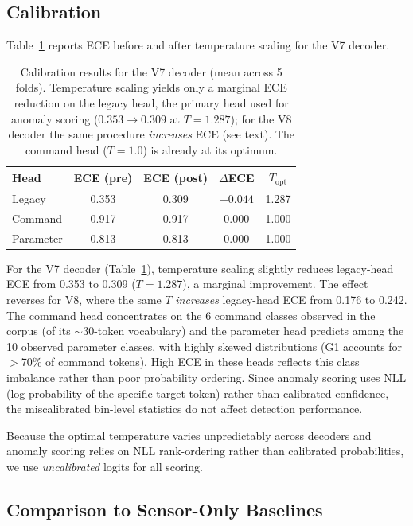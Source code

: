 \subsection{Calibration}
\label{sec:results_calibration}

Table~\ref{tab:calibration} reports ECE before and after temperature scaling for the V7 decoder.

\begin{table}[t]
\centering
\caption{Calibration results for the V7 decoder (mean across 5 folds). Temperature scaling yields only a marginal ECE reduction on the legacy head, the primary head used for anomaly scoring ($0.353 \to 0.309$ at $T = 1.287$); for the V8 decoder the same procedure \emph{increases} ECE (see text). The command head ($T = 1.0$) is already at its optimum.}
\label{tab:calibration}
\begin{tabular}{@{}lcccc@{}}
\toprule
Head & ECE (pre) & ECE (post) & $\Delta$ECE & $T_{\text{opt}}$ \\
\midrule
Legacy       & 0.353 & 0.309 & $-0.044$ & 1.287 \\
Command      & 0.917 & 0.917 & 0.000 & 1.000 \\
Parameter    & 0.813 & 0.813 & 0.000 & 1.000 \\
\bottomrule
\end{tabular}
\end{table}

For the V7 decoder (Table~\ref{tab:calibration}), temperature scaling slightly reduces legacy-head ECE from 0.353 to 0.309 ($T = 1.287$), a marginal improvement.
The effect reverses for V8, where the same $T$ \emph{increases} legacy-head ECE from 0.176 to 0.242.
The command head concentrates on the 6 command classes observed in the corpus (of its ${\sim}30$-token vocabulary) and the parameter head predicts among the 10 observed parameter classes, with highly skewed distributions (G1 accounts for $>$70\% of command tokens).
High ECE in these heads reflects this class imbalance rather than poor probability ordering.
Since anomaly scoring uses NLL (log-probability of the specific target token) rather than calibrated confidence, the miscalibrated bin-level statistics do not affect detection performance.

Because the optimal temperature varies unpredictably across decoders and anomaly scoring relies on NLL rank-ordering rather than calibrated probabilities, we use \emph{uncalibrated} logits for all scoring.

\subsection{Comparison to Sensor-Only Baselines}
\label{sec:results_baselines}

